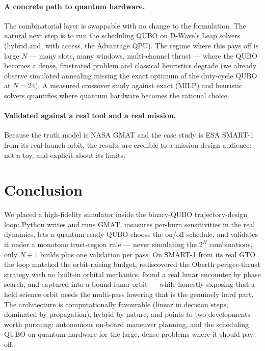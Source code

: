 \documentclass[11pt,a4paper]{article}
\theoremstyle{plain}
\begin{document}
\paragraph{A concrete path to quantum hardware.} The combinatorial layer is
swappable with no change to the formulation. The natural next step is to run
the scheduling QUBO on D-Wave's Leap solvers (hybrid and, with access, the
Advantage QPU). The regime where this pays off is large $N$ --- many slots,
many windows, multi-channel thrust --- where the QUBO becomes a dense,
frustrated problem and classical heuristics degrade (we already observe
simulated annealing missing the exact optimum of the duty-cycle QUBO at
$N=24$). A measured crossover study against exact (MILP) and heuristic solvers
quantifies where quantum hardware becomes the rational choice.

\paragraph{Validated against a real tool and a real mission.} Because the
truth model is NASA GMAT and the case study is ESA SMART-1 from its real
launch orbit, the results are credible to a mission-design audience: not a toy,
and explicit about its limits.

\section{Conclusion}\label{sec:conclusion}
We placed a high-fidelity simulator inside the binary-QUBO trajectory-design
loop: Python writes and runs GMAT, measures per-burn sensitivities in the real
dynamics, lets a quantum-ready QUBO choose the on/off schedule, and validates
it under a monotone trust-region rule --- never simulating the $2^{N}$
combinations, only $N{+}1$ builds plus one validation per pass. On SMART-1 from
its real GTO the loop matched the orbit-raising budget, rediscovered the
Oberth perigee-thrust strategy with no built-in orbital mechanics, found a real
lunar encounter by phase search, and captured into a bound lunar orbit ---
while honestly exposing that a held science orbit needs the multi-pass lowering
that is the genuinely hard part. The architecture is computationally
favourable (linear in decision steps, dominated by propagation), hybrid by
nature, and points to two developments worth pursuing: autonomous on-board
maneuver planning, and the scheduling QUBO on quantum hardware for the large,
dense problems where it should pay off.
\end{document}
